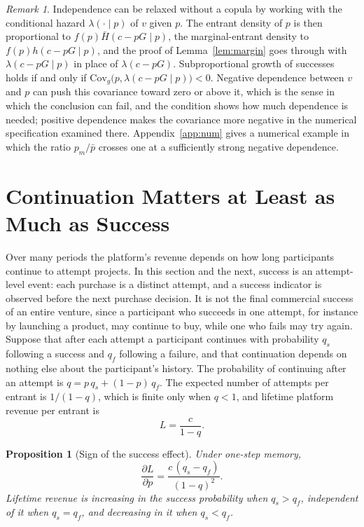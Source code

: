 \documentclass[11pt]{article}
\newtheorem{proposition}{Proposition}
\theoremstyle{remark}
\newtheorem{remark}{Remark}
\newcommand{\Hbar}{\bar H}
\begin{document}
\begin{remark}
Independence can be relaxed without a copula by working with the conditional hazard $\lambda(\cdot\mid p)$ of $v$ given $p$. The entrant density of $p$ is then proportional to $f(p)\Hbar(c-pG\mid p)$, the marginal-entrant density to $f(p)h(c-pG\mid p)$, and the proof of Lemma~\ref{lem:margin} goes through with $\lambda(c-pG\mid p)$ in place of $\lambda(c-pG)$. Subproportional growth of successes holds if and only if $\mathrm{Cov}_g\bigl(p,\lambda(c-pG\mid p)\bigr)<0$. Negative dependence between $v$ and $p$ can push this covariance toward zero or above it, which is the sense in which the conclusion can fail, and the condition shows how much dependence is needed; positive dependence makes the covariance more negative in the numerical specification examined there. Appendix~\ref{app:num} gives a numerical example in which the ratio $p_m/\bar p$ crosses one at a sufficiently strong negative dependence.
\end{remark}

\section{Continuation Matters at Least as Much as Success}\label{sec:cont}

Over many periods the platform's revenue depends on how long participants continue to attempt projects. In this section and the next, success is an attempt-level event: each purchase is a distinct attempt, and a success indicator is observed before the next purchase decision. It is not the final commercial success of an entire venture, since a participant who succeeds in one attempt, for instance by launching a product, may continue to buy, while one who fails may try again. Suppose that after each attempt a participant continues with probability $q_s$ following a success and $q_f$ following a failure, and that continuation depends on nothing else about the participant's history. The probability of continuing after an attempt is $q = p\,q_s + (1-p)\,q_f$. The expected number of attempts per entrant is $1/(1-q)$, which is finite only when $q<1$, and lifetime platform revenue per entrant is
\[
L=\frac{c}{1-q}.
\]

\begin{proposition}[Sign of the success effect]\label{prop:cont}
Under one-step memory,
\[
\frac{\partial L}{\partial p}=\frac{c\,(q_s-q_f)}{(1-q)^2}.
\]
Lifetime revenue is increasing in the success probability when $q_s>q_f$, independent of it when $q_s=q_f$, and decreasing in it when $q_s<q_f$.
\end{proposition}
\end{document}
